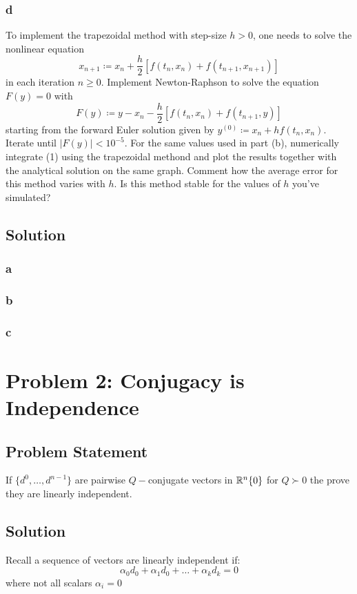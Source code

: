 \documentclass[11pt]{report}
\theoremstyle{definition}
\begin{document}
\subsubsection*{d}
To implement the trapezoidal method with step-size $h>0$, one needs to solve the
nonlinear equation
\[x_{n+1}\coloneqq x_n + \frac{h}{2}[f(t_n,x_n)+f(t_{n+1},x_{n+1})]\]
in each iteration $n\geq 0$. Implement Newton-Raphson to solve the equation $F(y)=0$ with
\[ F(y)\coloneqq y-x_n-\frac{h}{2}[f(t_n,x_n)+f(t_{n+1},y)] \]
starting from the forward Euler solution given by $y^{(0)}\coloneqq x_n+hf(t_n,x_n)$.
Iterate until $|F(y)|<10^{-5}$. For the same values used in part (b), numerically
integrate (1) using the trapezoidal methond and plot the results together with the
analytical solution on the same graph. Comment how the average error for this method
varies with $h$. Is this method stable for the values of $h$ you've simulated?

\subsection*{Solution}
\subsubsection*{a}
\subsubsection*{b}
\subsubsection*{c}

\newpage
\section*{Problem 2: Conjugacy is Independence}
\subsection*{Problem Statement}
If $\{d^0,\ldots,d^{n-1}\}$ are pairwise $Q-$conjugate vectors in $\mathbb{R}^n\\\{0\}$
for $Q\succ0$ the prove they are linearly independent.

\subsection*{Solution}
Recall a sequence of vectors are linearly independent if:
\[\alpha_0d_0+\alpha_1d_0+\ldots+\alpha_kd_k=0\]
where not all scalars $\alpha_i=0$
\end{document}
